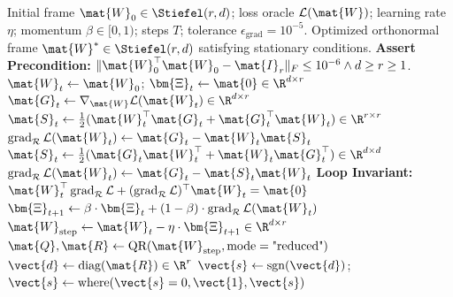 \begin{algorithm}[H]
\caption[Riemannian Geodesic Retraction and Householder Gradient Flow on (r, d)]{Riemannian Geodesic Retraction and Householder Gradient Flow on $\Stiefel(r, d)$}
\label{alg:riemannian_stiefel_retraction}
\begin{algorithmic}[1]
\REQUIRE Initial frame $\mat{W}_0 \in \Stiefel(r, d)$; loss oracle $\mathcal{L}(\mat{W})$; learning rate $\eta$; momentum $\beta \in [0, 1)$; steps $T$; tolerance $\epsilon_{\text{grad}} = 10^{-5}$.
\ENSURE Optimized orthonormal frame $\mat{W}^* \in \Stiefel(r, d)$ satisfying stationary conditions.
\STATE \textbf{Assert Precondition:} $\|\mat{W}_0^\top \mat{W}_0 - \mat{I}_r\|_F \le 10^{-6} \land d \ge r \ge 1$.
\STATE $\mat{W}_t \leftarrow \mat{W}_0$; $\bm{\Xi}_t \leftarrow \mat{0} \in \R^{d \times r}$ 
    \STATE $\mat{G}_t \leftarrow \nabla_{\mat{W}} \mathcal{L}(\mat{W}_t) \in \R^{d \times r}$ 
    \STATE {}
        \STATE $\mat{S}_t \leftarrow \frac{1}{2}(\mat{W}_t^\top \mat{G}_t + \mat{G}_t^\top \mat{W}_t) \in \R^{r \times r}$ 
        \STATE $\operatorname{grad}_{\mathcal{R}} \mathcal{L}(\mat{W}_t) \leftarrow \mat{G}_t - \mat{W}_t \mat{S}_t$
    \ELSE
        \STATE $\mat{S}_t \leftarrow \frac{1}{2}(\mat{G}_t \mat{W}_t^\top + \mat{W}_t \mat{G}_t^\top) \in \R^{d \times d}$
        \STATE $\operatorname{grad}_{\mathcal{R}} \mathcal{L}(\mat{W}_t) \leftarrow \mat{G}_t - \mat{S}_t \mat{W}_t$
    \ENDIF
    \STATE \textbf{Loop Invariant:} $\mat{W}_t^\top \operatorname{grad}_{\mathcal{R}}\mathcal{L} + (\operatorname{grad}_{\mathcal{R}}\mathcal{L})^\top \mat{W}_t = \mat{0}$
    \STATE {}
    \STATE $\bm{\Xi}_{t+1} \leftarrow \beta \cdot \bm{\Xi}_t + (1 - \beta) \cdot \operatorname{grad}_{\mathcal{R}}\mathcal{L}(\mat{W}_t)$
    \STATE {}
    \STATE $\mat{W}_{\text{step}} \leftarrow \mat{W}_t - \eta \cdot \bm{\Xi}_{t+1} \in \R^{d \times r}$
    \STATE $\mat{Q}, \mat{R} \leftarrow \text{QR}(\mat{W}_{\text{step}}, \text{mode}=\text{"reduced"})$
    \STATE $\vect{d} \leftarrow \text{diag}(\mat{R}) \in \R^r$
    \STATE $\vect{s} \leftarrow \operatorname{sgn}(\vect{d})$; $\vect{s} \leftarrow \text{where}(\vect{s} = 0, \vect{1}, \vect{s})$ 

\end{algorithmic}
\end{algorithm}
